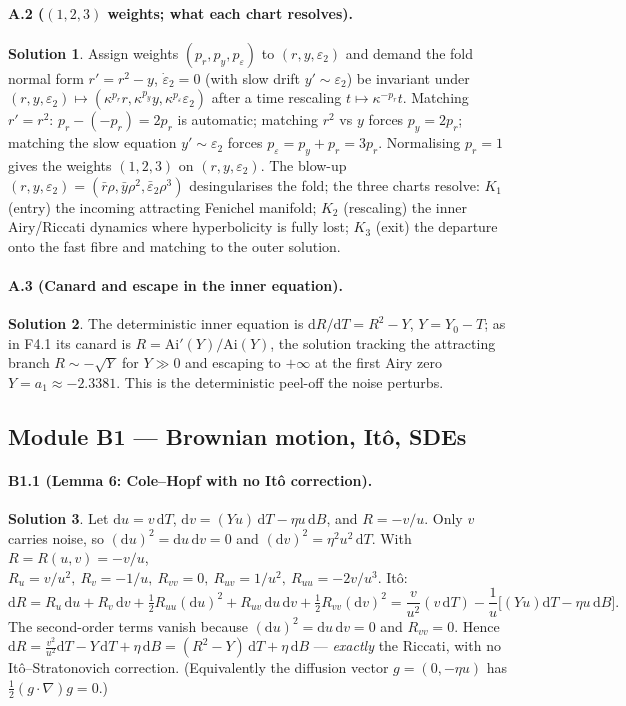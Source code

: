 \documentclass[11pt]{article}
\newcommand{\ep}{\varepsilon_2}
\newcommand{\Ai}{\mathrm{Ai}}
\newcommand{\dd}{\mathrm{d}}
\theoremstyle{definition}
\newtheorem*{sol}{Solution}
\begin{document}
\paragraph{A.2 ($(1,2,3)$ weights; what each chart resolves).}
\begin{sol}
Assign weights $(p_r,p_y,p_\varepsilon)$ to $(r,y,\ep)$ and demand the fold normal form
$r'=r^2-y$, $\dot\ep=0$ (with slow drift $y'\sim\ep$) be invariant under
$(r,y,\ep)\mapsto(\kappa^{p_r}r,\kappa^{p_y}y,\kappa^{p_\varepsilon}\ep)$ after a time
rescaling $t\mapsto\kappa^{-p_r}t$. Matching $r'=r^2$: $p_r-(-p_r)=2p_r$ is automatic;
matching $r^2$ vs $y$ forces $p_y=2p_r$; matching the slow equation $y'\sim\ep$ forces
$p_\varepsilon=p_y+p_r=3p_r$. Normalising $p_r=1$ gives the weights $(1,2,3)$ on $(r,y,\ep)$.
The blow-up $(r,y,\ep)=(\bar r\rho,\bar y\rho^2,\bar\ep\rho^3)$ desingularises the fold; the three
charts resolve: $K_1$ (entry) the incoming attracting Fenichel manifold; $K_2$ (rescaling) the
inner Airy/Riccati dynamics where hyperbolicity is fully lost; $K_3$ (exit) the departure onto
the fast fibre and matching to the outer solution.
\end{sol}

\paragraph{A.3 (Canard and escape in the inner equation).}
\begin{sol}
The deterministic inner equation is $\dd R/\dd T=R^2-Y$, $Y=Y_0-T$; as in F4.1 its canard is
$R=\Ai'(Y)/\Ai(Y)$, the solution tracking the attracting branch $R\sim-\sqrt Y$ for $Y\gg0$ and
escaping to $+\infty$ at the first Airy zero $Y=a_1\approx-2.3381$. This is the deterministic
peel-off the noise perturbs.
\end{sol}

\subsection*{Module B1 --- Brownian motion, It\^o, SDEs}

\paragraph{B1.1 (Lemma 6: Cole--Hopf with no It\^o correction).}
\begin{sol}
Let $\dd u=v\,\dd T$, $\dd v=(Yu)\,\dd T-\eta u\,\dd B$, and $R=-v/u$. Only $v$ carries noise, so
$(\dd u)^2=\dd u\,\dd v=0$ and $(\dd v)^2=\eta^2u^2\,\dd T$. With $R=R(u,v)=-v/u$,
$R_u=v/u^2,\ R_v=-1/u,\ R_{vv}=0,\ R_{uv}=1/u^2,\ R_{uu}=-2v/u^3$. It\^o:
\[
\dd R=R_u\,\dd u+R_v\,\dd v+\tfrac12R_{uu}(\dd u)^2+R_{uv}\,\dd u\,\dd v+\tfrac12R_{vv}(\dd v)^2
=\frac{v}{u^2}(v\,\dd T)-\frac1u\bigl[(Yu)\dd T-\eta u\,\dd B\bigr].
\]
The second-order terms vanish because $(\dd u)^2=\dd u\,\dd v=0$ and $R_{vv}=0$. Hence
$\dd R=\frac{v^2}{u^2}\dd T-Y\,\dd T+\eta\,\dd B=(R^2-Y)\,\dd T+\eta\,\dd B$ --- \emph{exactly}
the Riccati, with no It\^o--Stratonovich correction. (Equivalently the diffusion vector
$g=(0,-\eta u)$ has $\tfrac12(g\!\cdot\!\nabla)g=0$.)
\end{sol}
\end{document}
